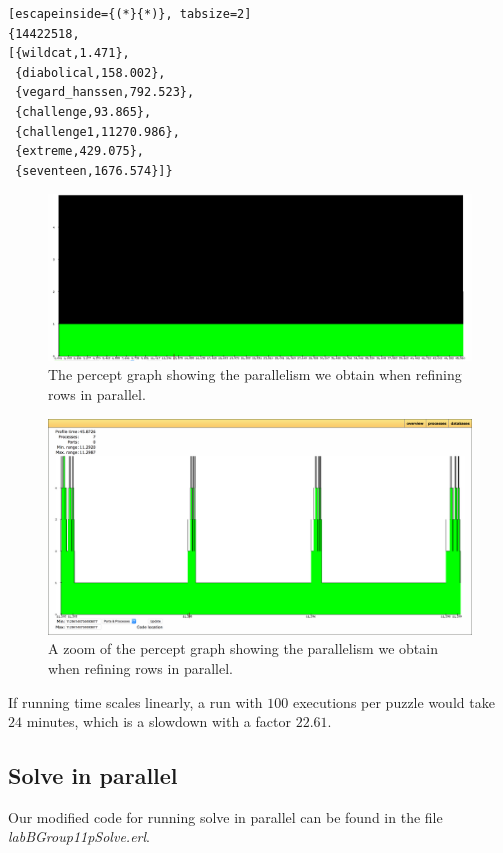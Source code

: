 \documentclass[a4paper]{article}
\begin{document}
\begin{lstlisting}[escapeinside={(*}{*)}, tabsize=2]
{14422518,
[{wildcat,1.471},
 {diabolical,158.002},
 {vegard_hanssen,792.523},
 {challenge,93.865},
 {challenge1,11270.986},
 {extreme,429.075},
 {seventeen,1676.574}]}
\end{lstlisting}

\begin{figure}[!htb]
\begin{center}
\includegraphics[scale=0.2]{refine_in_parallel}
\caption{The percept graph showing the parallelism we obtain when refining rows in parallel.}
\label{fig:refpar}
\end{center}
\end{figure}
\begin{figure}[!htb]
\begin{center}
\includegraphics[scale=0.2]{refine_in_parallel_zoom}
\caption{A zoom of the percept graph showing the parallelism we obtain when refining rows in parallel.}
\label{fig:refparzoom}
\end{center}
\end{figure}

If running time scales linearly, a run with $100$ executions per puzzle would take $24$ minutes, which is a slowdown with a factor $22.61$.

\subsection{Solve in parallel}
Our modified code for running solve in parallel can be found in the file \textit{labBGroup11\textunderscore pSolve.erl}.
\end{document}
